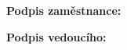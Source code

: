 \documentclass[10pt, a4paper]{article}%
\begin{document}
\vspace{0.5cm}
\begin{flushleft}%
    \begin{minipage}{0.49\textwidth}
        \normalsize\textbf{Podpis zaměstnance:\underline{\hspace{4cm}}}
    \end{minipage}
    \hfill
    \begin{minipage}{0.49\textwidth}
        \normalsize\textbf{Podpis vedoucího: \underline{\hspace{4cm}}}
    \end{minipage}


\end{flushleft}
\end{document}
